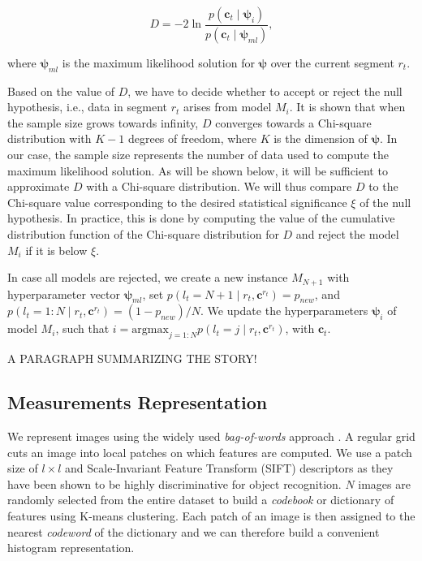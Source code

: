 \begin{equation}
\label{eqn:statistic}
D = -2\ln\frac{p(\mathbf{c}_t\mid \boldsymbol{\psi}_i)}{p(\mathbf{c}_t\mid
\boldsymbol{\psi}_{ml})},
\end{equation}

where $\boldsymbol{\psi}_{ml}$ is the maximum likelihood solution for
$\boldsymbol{\psi}$ over the current segment $r_t$.

Based on the value of $D$, we have to decide whether to accept or reject the
null hypothesis, i.e., data in segment $r_t$ arises from model $M_i$. It is
shown that when the sample size grows towards infinity, $D$ converges towards a
Chi-square distribution with $K-1$ degrees of freedom, where $K$ is the
dimension of $\boldsymbol{\psi}$. In our case, the sample size represents the
number of data used to compute the maximum likelihood solution. As will be
shown below, it will be sufficient to approximate $D$ with a Chi-square
distribution. We will thus compare $D$ to the Chi-square value corresponding to
the desired statistical significance $\xi$ of the null hypothesis. In practice,
this is done by computing the value of the cumulative distribution
function of the Chi-square distribution for $D$ and reject the model
$M_i$ if it is below $\xi$.

In case all models are rejected, we create a new instance $M_{N+1}$
with hyperparameter vector $\boldsymbol{\psi}_{ml}$, set $p(l_t=N+1\mid r_t,
\mathbf{c}^{r_t})=p_{new}$, and $p(l_t=1:N\mid r_t,\mathbf{c}^{r_t})=
(1-p_{new})/N$. We update the hyperparameters $\boldsymbol{\psi}_i$ of model
$M_i$, such that $i=\text{argmax}_{j=1:N}p(l_t=j\mid
r_t,\mathbf{c}^{r_t})$, with $\mathbf{c}_t$.

A PARAGRAPH SUMMARIZING THE STORY!

\subsection{Measurements Representation}
We represent images using the widely used \emph{bag-of-words}
approach
. A regular grid cuts an image into local patches on
which features are computed.  We use a patch size of $l\times l$ and
Scale-Invariant Feature Transform (SIFT) \cite{lowe04distinctive}
descriptors as they have been shown to be highly discriminative for
object recognition. $N$ images are randomly selected from the entire
dataset to build a \emph{codebook} or dictionary of features using
K-means clustering. Each patch of an image is then assigned to the
nearest \emph{codeword} of the dictionary and we can therefore build a
convenient histogram representation.

